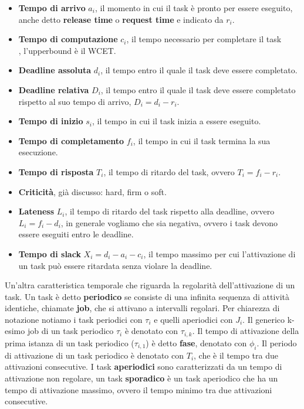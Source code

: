 \documentclass[12pt]{article}
\begin{document}
\begin{itemize}
    \item \textbf{Tempo di arrivo} $a_i$, il momento in cui il task è pronto per essere eseguito, anche detto \textbf{release time} o \textbf{request time} e indicato da $r_i$.
    \item \textbf{Tempo di computazione} $c_i$, il tempo necessario per completare il task\\ , l'upperbound è il WCET.
    \item \textbf{Deadline assoluta} $d_i$, il tempo entro il quale il task deve essere completato.
    \item \textbf{Deadline relativa} $D_i$, il tempo entro il quale il task deve essere completato rispetto al suo tempo di arrivo, $D_i=d_i-r_i$.
    \item \textbf{Tempo di inizio} $s_i$, il tempo in cui il task inizia a essere eseguito.
    \item \textbf{Tempo di completamento} $f_i$, il tempo in cui il task termina la sua esecuzione.
    \item \textbf{Tempo di risposta} $T_i$, il tempo di ritardo del task, ovvero $T_i=f_i-r_i$.
    \item \textbf{Criticità}, già discusso: hard, firm o soft.
    \item \textbf{Lateness} $L_i$, il tempo di ritardo del task rispetto alla deadline, ovvero $L_i=f_i-d_i$, in generale vogliamo che sia negativa, ovvero i task devono essere eseguiti entro le deadline.
    \item \textbf{Tempo di slack} $X_i=d_i-a_i-c_i$, il tempo massimo per cui l'attivazione di un task può essere ritardata senza violare la deadline.
\end{itemize}
Un'altra caratteristica temporale che riguarda la regolarità dell'attivazione di un task.
Un task è detto \textbf{periodico} se consiste di una infinita sequenza di attività identiche, chiamate \textbf{job}, che si attivano a intervalli regolari.
Per chiarezza di notazione notiamo i task periodici con $\tau_i$ e quelli aperiodici con $J_i$. Il generico k-esimo job di un task periodico $\tau_i$ è denotato con $\tau_{i,k}$.
Il tempo di attivazione della prima istanza di un task periodico ($\tau_{i,1}$) è detto \textbf{fase}, denotato con $\phi_i$.
Il periodo di attivazione di un task periodico è denotato con $T_i$, che è il tempo tra due attivazioni consecutive.
I task \textbf{aperiodici} sono caratterizzati da un tempo di attivazione non regolare, un task \textbf{sporadico} è un task aperiodico che ha un tempo di attivazione massimo, ovvero il tempo minimo tra due attivazioni consecutive.\\
\end{document}
